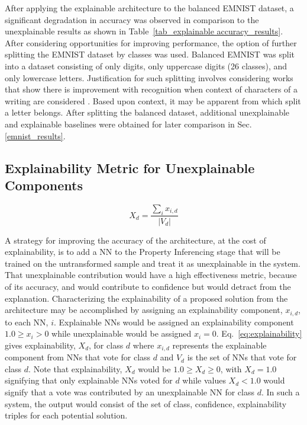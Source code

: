 \documentclass[conference]{IEEEtran}
\begin{document}
After applying the explainable architecture to the balanced EMNIST dataset, a
significant degradation in accuracy was observed in comparison to the
unexplainable results as shown in Table~\ref{tab_explainable accuracy_results}.
After considering opportunities for improving performance, the option of further
splitting the EMNIST dataset by classes was used.  Balanced EMNIST was split
into a dataset consisting of only digits, only uppercase digits (26 classes),
and only lowercase letters.  Justification for such splitting involves
considering works that show there is improvement with recognition when context
of characters of a writing are considered \cite{506792}.  Based upon context, it
may be apparent from which split a letter belongs. After splitting the balanced
dataset, additional unexplainable and explainable baselines were obtained for
later comparison in Sec. \ref{emnist_results}.

\subsection{Explainability Metric for Unexplainable Components}
\label{method:metric}

\begin{equation}
    X_d=\frac{\sum_i x_{i,d}}{|V_d|}
    \label{eq:explainability}
\end{equation}

A strategy for improving the accuracy of the architecture, at the cost of
explainability, is to add a NN to the Property Inferencing stage that will be
trained on the untransformed sample and treat it as unexplainable in the system.
That unexplainable contribution would have a high effectiveness metric, because
of its accuracy, and would contribute to confidence but would detract from the
explanation.  Characterizing the explainability of a proposed solution from the
architecture may be accomplished by assigning an explainability component,
$x_{i,d}$, to each NN, $i$.  Explainable NNs would be assigned an explainability
component $1.0 \geq x_i > 0$ while unexplainable would be assigned $x_i = 0$.
Eq.~\ref{eq:explainability} gives explainability, $X_d$, for class $d$ where
$x_{i,d}$ represents the explainable component from NNs that vote for class $d$
and $V_d$ is the set of NNs that vote for class $d$.  Note that explainability,
$X_d$ would be $1.0 \geq X_d \geq 0$, with $X_d = 1.0$ signifying that only
explainable NNs voted for $d$ while values $X_d < 1.0$ would signify that a vote
was contributed by an unexplainable NN for class $d$.  In such a system, the
output would consist of the set of class, confidence, explainability triples for
each potential solution.
\end{document}
